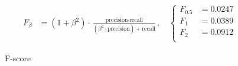 \begin{figure}
    \centering
    \begin{align*}
        F_\beta &= (1+\beta^2) \cdot \frac{\text{precision} \cdot \text{recall}}{(\beta^2\cdot\text{precision}) + \text{recall}},\quad
        \begin{cases} 
        F_{0.5} &= 0.0247\\ 
        F_1     &= 0.0389\\ 
        F_2     &= 0.0912\\ 
        \end{cases}
    \end{align*}
    \caption{F-score}
    \label{fig:f_score}
\end{figure}